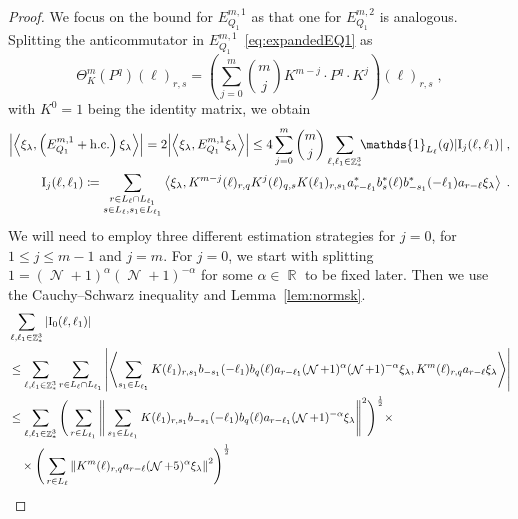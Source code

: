 \documentclass[12pt,a4paper]{article}
\numberwithin{equation}{section}
\newcommand{\1}{\mathbb{I}}
\newcommand{\I}{\mathrm{I}}
\DeclareMathOperator{\R}{\mathbb{R}}
\DeclareMathOperator{\Z}{\mathbb{Z}}
\DeclareMathOperator{\NN}{\mathcal{N}}
\newcommand{\half}{\frac{1}{2}}
\newcommand{\eva}[1]{\left\langle #1 \right\rangle}
\theoremstyle{plain}
\theoremstyle{definition}
\theoremstyle{remark}
\theoremstyle{plain}
\theoremstyle{definition}
\theoremstyle{remark}
\begin{document}
\begin{proof}
We focus on the bound for $ E^{m,1}_{Q_1} $ as that one for $ E^{m,2}_{Q_1} $ is analogous. Splitting the anticommutator in $ E^{m,1}_{Q_1} $~\eqref{eq:expandedEQ1} as
\begin{equation} \label{eq:q-q}
	\Theta^m_K(P^q)(\ell)_{r,s}
	= \left(\sum\limits_{j=0}^m {{m}\choose j} K^{m-j} \cdot P^q \cdot K^{j}\right) \! (\ell)_{r,s} \;,
\end{equation}
with $ K^0 = 1 $ being the identity matrix, we obtain
\begin{equation} \label{eq:EQ1111}
\begin{aligned}
	\abs{\eva{\xi_\lambda,\left(E^{m,1}_{Q_1}+\mathrm{h.c.}\right) \xi_\lambda }} 
	= 2\abs{\eva{\xi_\lambda, E^{m,1}_{Q_1} \xi_\lambda }}
	\le 4 \sum_{j=0}^m {{m}\choose j} \sum\limits_{\ell,\ell_1  \in \Z^3_*}\!\! \mathds{1}_{L_\ell}(q) |\I_j(\ell, \ell_1)| \;,\\
	\I_j(\ell, \ell_1)
	\coloneq \sum\limits_{\substack{r\in L_{\ell} \cap L_{\ell_1}\\ s \in L_{\ell},s_1\in L_{\ell_1}}}
		\eva{\xi_\lambda, K^{m-j}(\ell)_{r,q} K^{j}(\ell)_{q,s} K(\ell_1)_{r,s_1} a^*_{r-\ell_1} b^*_{s}(\ell) b^*_{-s_1}(-\ell_1) a_{r-\ell} \xi_\lambda} \;. \\
\end{aligned}
\end{equation}
We will need to employ three different estimation strategies for $ j = 0 $, for $ 1 \le j \le m-1 $ and $ j = m $. For $ j = 0 $, we start with splitting $1 = (\NN+1)^{\alpha}(\NN+1)^{-\alpha}$ for some $\alpha \in \R$ to be fixed later. Then we use the Cauchy--Schwarz inequality and Lemma~\ref{lem:normsk}.
\textcolor{green!30!black}{
\begin{align}
	&\sum_{\ell,\ell_1 \in \Z^3_*} |\I_0(\ell, \ell_1)| \nonumber\\
	&\le \sum_{\ell,\ell_1 \in \Z^3_*} \sum\limits_{r \in L_\ell \cap L_{\ell_1}} \abs{\eva{ \sum\limits_{s_1 \in L_{\ell_1}} K(\ell_1)_{r,s_1} b_{-s_1}(-\ell_1) b_{q}(\ell) a_{r-\ell_1} (\NN+1)^{\alpha} (\NN+1)^{-\alpha} \xi_\lambda, K^{m}(\ell)_{r,q} a_{r-\ell} \xi_\lambda }}\nonumber\\
	&\leq \sum_{\ell,\ell_1 \in \Z^3_*} \Bigg( \sum\limits_{r \in L_{\ell_1}} \Bigg\Vert \sum\limits_{s_1 \in L_{\ell_1}} K(\ell_1)_{r,s_1} b_{-s_1}(-\ell_1) b_{q}(\ell) a_{r-\ell_1} (\NN+1)^{-\alpha}\xi_\lambda \Bigg\Vert^2\Bigg)^\half \times\nonumber\\
	&\quad \times \Bigg( \sum\limits_{r \in L_\ell} \norm{  K^{m}(\ell)_{r,q} a_{r-\ell} (\NN+5)^{\alpha}\xi_\lambda }^2\Bigg)^\half \nonumber\\

\end{align}}
\end{proof}
\end{document}
